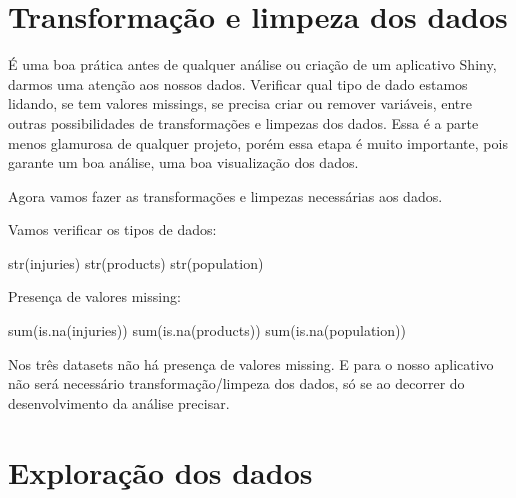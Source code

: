 \documentclass[
]{book}
\newenvironment{Shaded}{\begin{snugshade}}{\end{snugshade}}
\newcommand{\FunctionTok}[1]{\textcolor[rgb]{0.00,0.00,0.00}{#1}}
\newcommand{\NormalTok}[1]{#1}
\begin{document}
\hypertarget{transformauxe7uxe3o-e-limpeza-dos-dados}{%
\section{\texorpdfstring{\textbf{Transformação e limpeza dos dados}}{Transformação e limpeza dos dados}}\label{transformauxe7uxe3o-e-limpeza-dos-dados}}

É uma boa prática antes de qualquer análise ou criação de um aplicativo Shiny, darmos uma atenção aos nossos dados. Verificar qual tipo de dado estamos lidando, se tem valores missings, se precisa criar ou remover variáveis, entre outras possibilidades de transformações e limpezas dos dados. Essa é a parte menos glamurosa de qualquer projeto, porém essa etapa é muito importante, pois garante um boa análise, uma boa visualização dos dados.

Agora vamos fazer as transformações e limpezas necessárias aos dados.

Vamos verificar os tipos de dados:

\begin{Shaded}
\begin{Highlighting}[]
\FunctionTok{str}\NormalTok{(injuries) }
\FunctionTok{str}\NormalTok{(products)}
\FunctionTok{str}\NormalTok{(population)}
\end{Highlighting}
\end{Shaded}

Presença de valores missing:

\begin{Shaded}
\begin{Highlighting}[]
\FunctionTok{sum}\NormalTok{(}\FunctionTok{is.na}\NormalTok{(injuries))}
\FunctionTok{sum}\NormalTok{(}\FunctionTok{is.na}\NormalTok{(products))}
\FunctionTok{sum}\NormalTok{(}\FunctionTok{is.na}\NormalTok{(population))}
\end{Highlighting}
\end{Shaded}

Nos três datasets não há presença de valores missing. E para o nosso aplicativo não será necessário transformação/limpeza dos dados, só se ao decorrer do desenvolvimento da análise precisar.

\hypertarget{explorauxe7uxe3o-dos-dados}{%
\section{\texorpdfstring{\textbf{Exploração dos dados}}{Exploração dos dados}}\label{explorauxe7uxe3o-dos-dados}}
\end{document}

